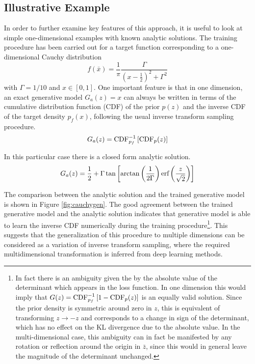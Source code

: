 \documentclass[a4paper,11pt]{article}
\begin{document}

\subsection{Illustrative Example}
In order to further examine key features of this approach, it is useful to look at simple one-dimensional examples with known analytic solutions.  The training procedure has been carried out for a target function corresponding to a one-dimensional Cauchy distribution
\begin{equation}
 f(\bar x) = \frac{1}{\pi}\frac{\Gamma}{\left(x-\frac{1}{2}\right)^2+\Gamma^2}
\end{equation}
with $\Gamma=1/10$ and $x\in[0,1]$.  One important feature is that in one dimension, an exact generative model $G_a(z)=x$ can always be written in terms of the cumulative distribution function (CDF) of the prior $p(z)$ and the inverse CDF of the target density $p_f(x)$, following the usual inverse transform sampling procedure.
\begin{equation}
 G_a(z) = \textnormal{CDF}^{-1}_{p_f}\left[\textnormal{CDF}_p(z)\right]
\end{equation}

In this particular case there is a closed form analytic solution.
\begin{equation}
  G_a(z) = \frac{1}{2} + \Gamma\tan\left[\arctan\left(\frac{1}{2\Gamma}\right)\textnormal{erf}\left(\frac{z}{\sqrt{2}}\right)\right]
\end{equation}

The comparison between the analytic solution and the trained generative model is shown in Figure \ref{fig:cauchygen}.  The good agreement between the trained generative model and the analytic solution indicates that generative model is able to learn the inverse CDF numerically during the training procedure\footnote{In fact there is an ambiguity given the by the absolute value of the determinant which appears in the loss function.  In one dimension this would imply that $G(z) = \textnormal{CDF}^{-1}_{p_f}\left[1-\textnormal{CDF}_p(z)\right]$ is an equally valid solution.  Since the prior density is symmetric around zero in $z$, this is equivalent of transforming $z\rightarrow -z$ and corresponds to a change in sign of the determinant, which has no effect on the KL divergence due to the absolute value.  In the multi-dimensional case, this ambiguity can in fact be manifested by any rotation or reflection around the origin in $\bar z$, since this would in general leave the magnitude of the determinant unchanged.}.  This suggests that the generalization of this procedure to multiple dimensions can be considered as a variation of inverse transform sampling, where the required multidimensional transformation is inferred from deep learning methods.
\end{document}
